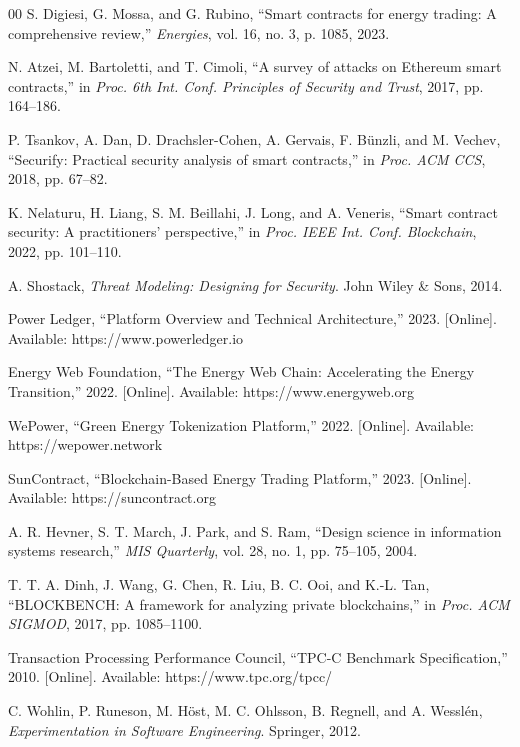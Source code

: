 \documentclass[conference]{IEEEtran}
\begin{document}
\begin{thebibliography}{00}
 S. Digiesi, G. Mossa, and G. Rubino, ``Smart contracts for energy trading: A comprehensive review,'' \textit{Energies}, vol. 16, no. 3, p. 1085, 2023.

 N. Atzei, M. Bartoletti, and T. Cimoli, ``A survey of attacks on Ethereum smart contracts,'' in \textit{Proc. 6th Int. Conf. Principles of Security and Trust}, 2017, pp. 164--186.

 P. Tsankov, A. Dan, D. Drachsler-Cohen, A. Gervais, F. B\"unzli, and M. Vechev, ``Securify: Practical security analysis of smart contracts,'' in \textit{Proc. ACM CCS}, 2018, pp. 67--82.

 K. Nelaturu, H. Liang, S. M. Beillahi, J. Long, and A. Veneris, ``Smart contract security: A practitioners' perspective,'' in \textit{Proc. IEEE Int. Conf. Blockchain}, 2022, pp. 101--110.

 A. Shostack, \textit{Threat Modeling: Designing for Security}. John Wiley \& Sons, 2014.

 Power Ledger, ``Platform Overview and Technical Architecture,'' 2023. [Online]. Available: https://www.powerledger.io

 Energy Web Foundation, ``The Energy Web Chain: Accelerating the Energy Transition,'' 2022. [Online]. Available: https://www.energyweb.org

 WePower, ``Green Energy Tokenization Platform,'' 2022. [Online]. Available: https://wepower.network

 SunContract, ``Blockchain-Based Energy Trading Platform,'' 2023. [Online]. Available: https://suncontract.org

 A. R. Hevner, S. T. March, J. Park, and S. Ram, ``Design science in information systems research,'' \textit{MIS Quarterly}, vol. 28, no. 1, pp. 75--105, 2004.

 T. T. A. Dinh, J. Wang, G. Chen, R. Liu, B. C. Ooi, and K.-L. Tan, ``BLOCKBENCH: A framework for analyzing private blockchains,'' in \textit{Proc. ACM SIGMOD}, 2017, pp. 1085--1100.

 Transaction Processing Performance Council, ``TPC-C Benchmark Specification,'' 2010. [Online]. Available: https://www.tpc.org/tpcc/

 C. Wohlin, P. Runeson, M. H\"ost, M. C. Ohlsson, B. Regnell, and A. Wessl\'en, \textit{Experimentation in Software Engineering}. Springer, 2012.

\end{thebibliography}
\end{document}
